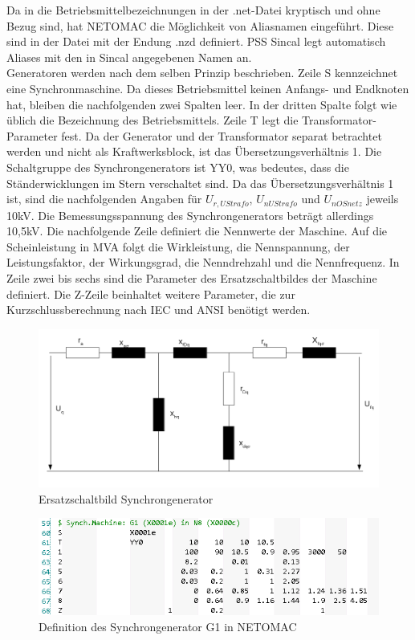 \documentclass{scrartcl}
\begin{document}
\begin{onehalfspace}
Da in die Betriebsmittelbezeichnungen in der .net-Datei kryptisch und ohne Bezug sind, hat NETOMAC die Möglichkeit von Aliasnamen eingeführt. Diese sind in der Datei mit der Endung .nzd definiert. PSS Sincal legt automatisch Aliases mit den in Sincal angegebenen Namen an. \\
Generatoren werden nach dem selben Prinzip beschrieben. Zeile S kennzeichnet eine Synchronmaschine. Da dieses Betriebsmittel keinen Anfangs- und Endknoten hat, bleiben die nachfolgenden zwei Spalten leer. In der dritten Spalte folgt wie üblich die Bezeichnung des Betriebsmittels. Zeile T legt die Transformator-Parameter fest. Da der Generator und der Transformator separat betrachtet werden und nicht als Kraftwerksblock, ist das Übersetzungsverhältnis 1. Die Schaltgruppe des Synchrongenerators ist YY0, was bedeutes, dass die Ständerwicklungen im Stern verschaltet sind. Da das Übersetzungsverhältnis 1 ist, sind die nachfolgenden Angaben für $U_{r,UStrafo}$, $U_{nUStrafo}$ und $U_{nOSnetz}$ jeweils 10kV. Die Bemessungsspannung des Synchrongenerators beträgt allerdings 10,5kV. Die nachfolgende Zeile definiert die Nennwerte der Maschine. Auf die Scheinleistung in MVA folgt die Wirkleistung, die Nennspannung, der Leistungsfaktor, der Wirkungsgrad, die Nenndrehzahl und die Nennfrequenz. In Zeile zwei bis sechs sind die Parameter des Ersatzschaltbildes der Maschine definiert. Die Z-Zeile beinhaltet weitere Parameter, die zur Kurzschlussberechnung nach IEC und ANSI benötigt werden.

	\begin{figure}[H]
	\centering
	\includegraphics[scale=0.5]{img/esb-synchron.png}
	\caption{Ersatzschaltbild Synchrongenerator}
	\label{leitung-netomac}
	\end{figure}

	\begin{figure}[H]
	\centering
	\includegraphics[scale=0.75]{img/netomac-g1.png}
	\caption{Definition des Synchrongenerator G1 in NETOMAC}
	\label{leitung-netomac}
	\end{figure}


\end{onehalfspace}
\end{document}

